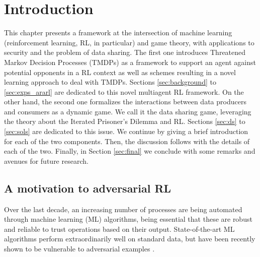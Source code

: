 \section{Introduction}

This chapter presents a framework at the intersection of machine learning (reinforcement learning, RL, in particular) and game theory, with applications to security and the problem of data sharing. 
The first one introduces Threatened Markov Decision Processes (TMDPs) 
as  a framework to support an agent against potential opponents
in a RL context as well as schemes 
resulting in a novel learning approach to deal with TMDPs. Sections \ref{sec:background} to \ref{sec:exps_ararl} are dedicated to this novel multiagent RL framework.
On the other hand, the second one formalizes the interactions between data producers and consumers as a dynamic game. We call it the data sharing game, leveraging the theory about the Iterated Prisoner's Dilemma and RL. Sections \ref{sec:ds} to \ref{sec:sols} are dedicated to this issue.
We continue by giving a brief introduction for each of the two components. Then, the discussion follows with the details of each of the two. Finally, in Section \ref{sec:final} we conclude with some remarks and avenues for future research.


\subsection{A motivation to adversarial RL}
Over the last decade,
an increasing number of processes are being automated through 
machine learning (ML) algorithms, being essential that these are robust and 
reliable to trust operations based on their output. State-of-the-art
ML algorithms perform extraordinarily well on standard data, but  
have been recently shown to be vulnerable to adversarial examples %
\cite{goodfellow2014explaining}. 


